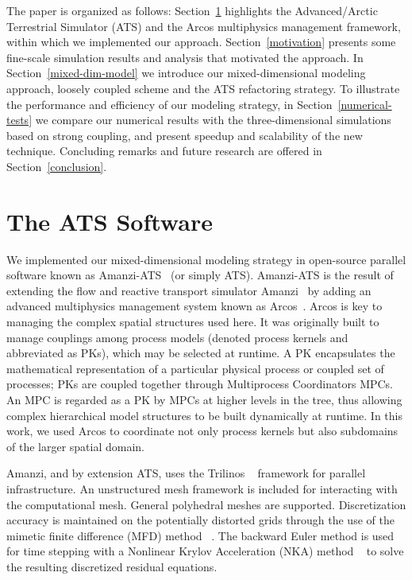\documentclass[review,11pt]{elsarticle}
\begin{document}
The paper is organized as follows: Section~\ref{arcos-framework} highlights the Advanced/Arctic  Terrestrial Simulator (ATS) and the Arcos multiphysics management framework, within which we implemented our approach. Section~\ref{motivation} presents some fine-scale simulation results and analysis that motivated the approach.  In Section~\ref{mixed-dim-model} we introduce our mixed-dimensional modeling approach, loosely coupled scheme and the ATS refactoring strategy. To illustrate the performance and efficiency of our modeling strategy, in Section~\ref{numerical-tests} we compare our numerical results with the three-dimensional simulations based on strong coupling, and present speedup and scalability of the new technique. Concluding remarks and future research are offered in Section~\ref{conclusion}.

\section{The ATS Software}\label{arcos-framework}

We implemented our mixed-dimensional modeling strategy in open-source parallel software known as Amanzi-ATS~\cite{ats-website} (or simply ATS). Amanzi-ATS is the result of extending the flow and reactive transport  simulator Amanzi~\cite{moulton2012high} by adding an advanced multiphysics management system known as Arcos~\cite{ecoon2016managing}. Arcos is key to managing the complex spatial structures used here. It was originally built to manage couplings among process models (denoted process kernels and abbreviated as PKs), which may be selected at runtime. A PK encapsulates the mathematical representation of a particular physical process or coupled set of processes; PKs are coupled together through Multiprocess Coordinators MPCs. An MPC is regarded as a PK by MPCs at higher levels in the tree, thus allowing complex hierarchical model structures to be built dynamically at runtime. In this work, we used Arcos to coordinate not only process kernels but also subdomains of the larger spatial domain. 

Amanzi, and by extension ATS, uses the Trilinos ~\cite{michael2003trilinos} framework for parallel infrastructure. An unstructured mesh framework \cite{garimella-2014-mstk} is included for interacting with the computational mesh. General polyhedral meshes are supported. Discretization accuracy is maintained on the potentially distorted grids through the use of the mimetic finite difference (MFD) method ~\cite{da2014mimetic, lipnikov2014mimetic}. The backward Euler method is used for time stepping with a Nonlinear Krylov Acceleration (NKA) method ~\cite{calef2013nonlinear, carlson1998design} to solve the resulting discretized residual equations. 
\end{document}
